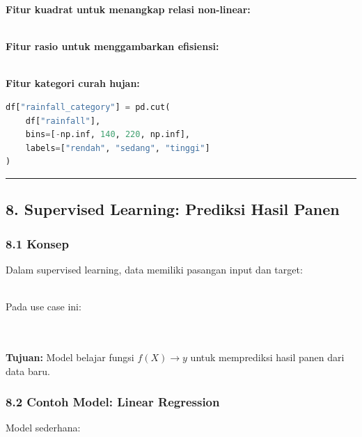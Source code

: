 \documentclass[12pt,a4paper]{article}
\begin{document}
\textbf{Fitur kuadrat untuk menangkap relasi non-linear:}


\\[
\text{rainfall}^2
\\]


\textbf{Fitur rasio untuk menggambarkan efisiensi:}


\\[
\text{fertilizer per area} = \frac{\text{fertilizer}}{\text{land area}}
\\]


\textbf{Fitur kategori curah hujan:}


\begin{lstlisting}[language=Python]
df["rainfall_category"] = pd.cut(
    df["rainfall"],
    bins=[-np.inf, 140, 220, np.inf],
    labels=["rendah", "sedang", "tinggi"]
)
\end{lstlisting}

\hrule


\subsection{8. Supervised Learning: Prediksi Hasil Panen}

\subsubsection{8.1 Konsep}

Dalam supervised learning, data memiliki pasangan input dan target:


\\[
(X, y)
\\]


Pada use case ini:


\\[
X = \{\text{curah hujan}, \text{suhu}, \text{kelembaban}, \text{pupuk}, \text{luas lahan}\}
\\]


\\[
y = \text{hasil panen}
\\]


\textbf{Tujuan:} Model belajar fungsi $f(X) \rightarrow y$ untuk memprediksi hasil panen dari data baru.


\subsubsection{8.2 Contoh Model: Linear Regression}

Model sederhana:
\end{document}
